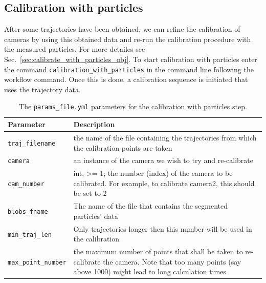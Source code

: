 \documentclass[10pt,a4paper]{article}
\begin{document}
\subsection{Calibration with particles}\label{sec:workflow_calibration_with_particles}

After some trajectories have been obtained, we can refine the calibration of cameras by using this obtained data and re-run the calibration procedure with the measured particles. For more detailes see Sec.~\ref{sec:calibrate_with_particles_obj}. To start calibration with particles enter the command \texttt{calibration\_with\_particles} in the command line following the workflow command. Once this is done, a calibration sequence is initiated that uses the trajectory data.



\begin{table}[!ht]
	\centering
	\caption{The \texttt{params\_file.yml} parameters for the calibration with particles step.}
	\begin{tabular}{l m{10cm}}
		\hline
		Parameter & Description\\
		\hline
		
		\texttt{traj\_filename} & the name of the file containing the trajectories from
		which the calibration points are taken\\[.5em]
		
		\texttt{camera} & an instance of the camera we wish to try and re-calibrate\\[.5em]
		
		\texttt{cam\_number} & int, >= 1; the number (index) of the camera to be
		calibrated. For example, to calibrate camera2, this should be set to 2\\[.5em]
		
		\texttt{blobs\_fname} & The name of the file that contains the segmented 
		particles' data\\[.5em]
		
		\texttt{min\_traj\_len} & Only trajectories longer then this number will be used in the calibration\\[.5em]
		
		\texttt{max\_point\_number} & the maximum number of points that shall be taken to re-calibrate the camera. Note that too many points (say above 1000) might lead to long calculation times\\[.5em]
		
		\hline
	\end{tabular}
\end{table}
\end{document}

